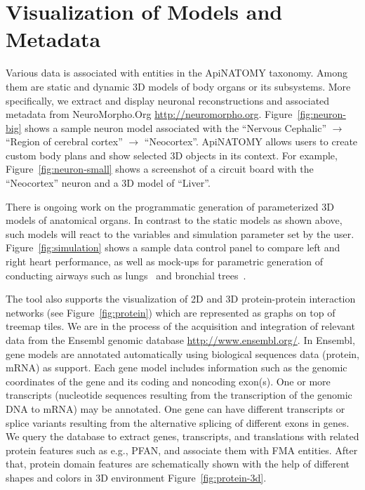 \section{Visualization of Models and Metadata} \label{sect:visualization2}               %

Various data is associated with entities in the ApiNATOMY taxonomy. 
Among them are static and dynamic 3D models of body organs or its subsystems. 
More specifically, we extract and display neuronal reconstructions and associated metadata from NeuroMorpho.Org \url{http://neuromorpho.org}.
Figure~\ref{fig:neuron-big} shows a sample neuron model associated with the ``Nervous Cephalic'' $\rightarrow$ ``Region of cerebral cortex'' $\rightarrow$ ``Neocortex''. ApiNATOMY allows users to create custom body plans and show selected 3D objects in its context. For example, Figure~\ref{fig:neuron-small} shows a screenshot of a circuit board with the ``Neocortex'' neuron and a 3D model of ``Liver''.

There is ongoing work on the programmatic generation of parameterized 3D models of anatomical organs. In contrast to the static models as shown above, such models will react to the variables and simulation parameter set by the user. Figure~\ref{fig:simulation} shows a sample data control panel to compare left and right heart performance, as well as mock-ups for parametric generation of conducting airways such as lungs~\cite{TPH00} and bronchial trees~\cite{THT+04}.

The tool also supports the visualization of 2D and 3D protein-protein interaction networks (see Figure~\ref{fig:protein}) which are represented as graphs on top of treemap tiles. We are in the process of the acquisition and integration of relevant data from the Ensembl genomic database \url{http://www.ensembl.org/}. In Ensembl, gene models are annotated automatically using biological sequences data (protein, mRNA) as support. Each gene model includes information such as the genomic coordinates of the gene and its coding and noncoding exon(s). One or more transcripts (nucleotide sequences resulting from the transcription of the genomic DNA to mRNA) may be annotated. One gene can have different transcripts or splice variants resulting from the alternative splicing of different exons in genes. We query the database to extract genes, transcripts, and translations with related protein features such as e.g., PFAN, and associate them with FMA entities. After that, protein domain features are schematically shown with the help of different shapes and colors in 3D environment Figure~\ref{fig:protein-3d}.

